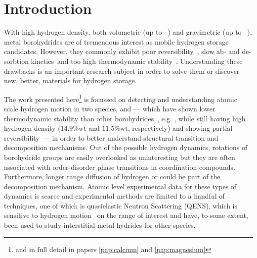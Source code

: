 \section{Introduction}
\label{sec:borohydrides-introduction}


With high hydrogen density, both volumetric (up to \missing{}~\citemiss) and gravimetric (up to \missing{}~\citemiss), metal borohydrides are of tremendous interest as mobile hydrogen storage candidates.
However, they commonly exhibit poor reversibility~\citemiss, slow ab- and de-sorbtion kinetics~\citemiss and too high thermodynamic stability~\citemiss.
Understanding these drawbacks is an important research subject in order to solve them or discover new, better, materials for hydrogen storage.

The work presented here\footnote{and in full detail in papers \ref{pap:calcium} and \ref{pap:magnesium}} is focussed on detecting and understanding atomic scale hydrogen motion in two species,  and  --- which have shown lower thermodynamic stability than other borohydrides~\cite{borohydride-stability-2006, calcium-stability-2006}, e.g. , while still having high hydrogen density ($14.9\%\text{wt}$ and $11.5\%\text{wt}$, respectively) and showing partial reversibility~\citemiss --- in order to better understand structural transition and decomposition mechanisms.
Out of the possible hydrogen dynamics, rotations of borohydride groups are easily overlooked as uninteresting but they are often associated with order-disorder phase transitions in coordination compounds.~\cite{order-disorder-2006, order-disorder-2010}
Furthermore, longer range diffusion of hydrogen or  could be part of the decomposition mechanism.
Atomic level experimental data for these types of dynamics is scarce and experimental methods are limited to a handful of techniques, one of which is quasielastic Neutron Scattering (QENS), which is sensitive to hydrogen motion~\cite{qens-bee-1988} on the range of interest and have, to some extent, been used to study interstitial metal hydrides for other species.~\citemiss


